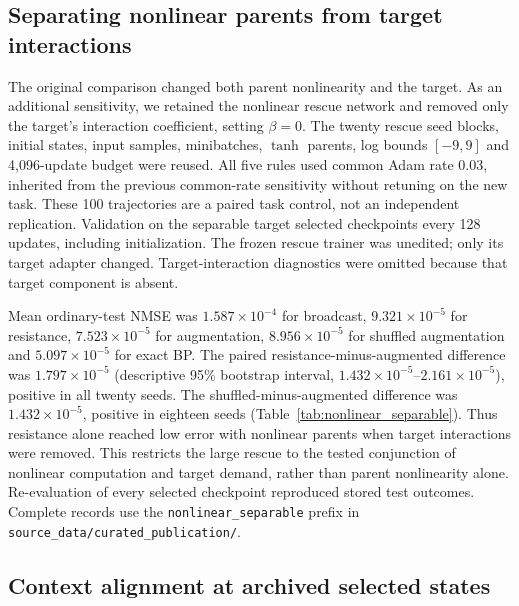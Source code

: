 \subsection{Separating nonlinear parents from target interactions}
\label{sec:nonlinear_separable}

The original comparison changed both parent nonlinearity and the target.
As an additional sensitivity, we retained the nonlinear rescue
network and removed only the target's interaction coefficient, setting
$\beta=0$. The twenty rescue seed blocks, initial states, input samples,
minibatches, $\tanh$ parents, log bounds $[-9,9]$ and 4,096-update budget
were reused. All five rules used common Adam rate 0.03, inherited from the
previous common-rate sensitivity without retuning on the new task. These
100 trajectories are a paired task control, not an independent replication.
Validation on the separable target selected checkpoints every 128 updates,
including initialization. The frozen rescue trainer was unedited; only its
target adapter changed. Target-interaction diagnostics were omitted because
that target component is absent.

Mean ordinary-test NMSE was $1.587\times10^{-4}$ for broadcast,
$9.321\times10^{-5}$ for resistance, $7.523\times10^{-5}$ for augmentation,
$8.956\times10^{-5}$ for shuffled augmentation and $5.097\times10^{-5}$ for
exact BP. The paired resistance-minus-augmented difference was
$1.797\times10^{-5}$ (descriptive 95\% bootstrap interval,
$1.432\times10^{-5}$--$2.161\times10^{-5}$), positive in all twenty seeds.
The shuffled-minus-augmented difference was $1.432\times10^{-5}$, positive
in eighteen seeds (Table~\ref{tab:nonlinear_separable}). Thus resistance alone
reached low error with nonlinear parents when target interactions were
removed. This restricts the large rescue to the tested conjunction of
nonlinear computation and target demand, rather than parent nonlinearity
alone. Re-evaluation of every selected checkpoint reproduced stored test
outcomes. Complete records use the \texttt{nonlinear\_separable} prefix in
\texttt{source\_data/curated\_publication/}.

\subsection{Context alignment at archived selected states}
\label{sec:context_alignment}

